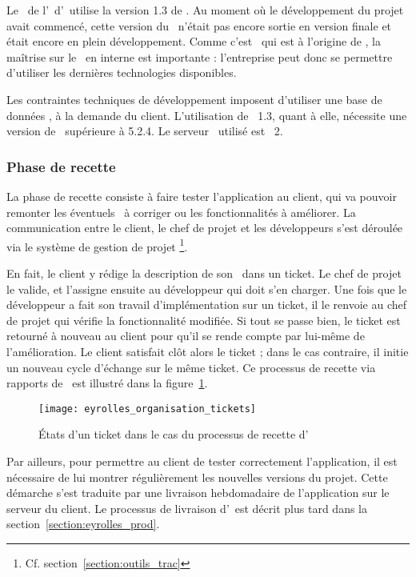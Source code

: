 Le \alotdeux\ de l'\aintranet\ d'\aey\ utilise la version 1.3 de \asf. Au moment où le développement du projet avait commencé, cette version du \afm\ n'était pas encore sortie en version finale et était encore en plein développement. Comme c'est \asl\ qui est à l'origine de \asf, la maîtrise sur le \afm\ en interne est importante : l'entreprise peut donc se permettre d'utiliser les dernières technologies disponibles.

Les contraintes techniques de développement imposent d'utiliser une base de données \apsql, à la demande du client. L'utilisation de \asf\ 1.3, quant à elle, nécessite une version de \aphp\ supérieure à 5.2.4. Le serveur \ahttp\ utilisé est \aapache~2.


\subsubsection{Phase de recette}

La phase de recette consiste à faire tester l'application au client, qui va pouvoir remonter les éventuels \abugs\ à corriger ou les fonctionnalités à améliorer. La communication entre le client, le chef de projet et les développeurs s'est déroulée via le système de gestion de projet \atrac\footnote{Cf. section~\ref{section:outils_trac}}.

En fait, le client y rédige la description de son \abug\ dans un ticket. Le chef de projet le valide, et l'assigne ensuite au développeur qui doit s'en charger. Une fois que le développeur a fait son travail d'implémentation sur un ticket, il le renvoie au chef de projet qui vérifie la fonctionnalité modifiée. Si tout se passe bien, le ticket est retourné à nouveau au client pour qu'il se rende compte par lui-même de l'amélioration. Le client satisfait clôt alors le ticket ; dans le cas contraire, il initie un nouveau cycle d'échange sur le même ticket. Ce processus de recette via rapports de \abugs\ est illustré dans la figure~\ref{figure:eyrolles_organisation_tickets}.

\begin{figure}
	\centering
	\texttt{[image: eyrolles\_organisation\_tickets]}
	\caption{États d'un ticket dans le cas du processus de recette d'\aey}
	\label{figure:eyrolles_organisation_tickets}
\end{figure}

Par ailleurs, pour permettre au client de tester correctement l'application, il est nécessaire de lui montrer régulièrement les nouvelles versions du projet. Cette démarche s'est traduite par une livraison hebdomadaire de l'application sur le serveur du client. Le processus de livraison d'\aey\ est décrit plus tard dans la section~\ref{section:eyrolles_prod}.

